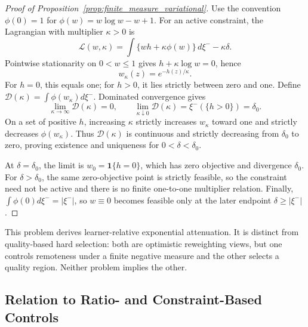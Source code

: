 \documentclass{article}
\theoremstyle{plain}
\theoremstyle{definition}
\theoremstyle{remark}
\begin{document}
\begin{proof}[Proof of Proposition~\ref{prop:finite_measure_variational}]
Use the convention
\(\phi(0)=1\) for
\(\phi(w)=w\log w-w+1\). For an active constraint, the Lagrangian with
multiplier \(\kappa>0\) is
\[
\mathcal L(w,\kappa)
=\int\{wh+\kappa\phi(w)\}\,d\xi^- -\kappa\delta.
\]
Pointwise stationarity on \(0<w\le1\) gives
\(h+\kappa\log w=0\), hence
\[
w_\kappa(z)=e^{-h(z)/\kappa}.
\]
For \(h=0\), this equals one; for \(h>0\), it lies strictly between
zero and one. Define
\(\mathcal D(\kappa)=\int\phi(w_\kappa)d\xi^-\). Dominated convergence gives
\[
\lim_{\kappa\to\infty}\mathcal D(\kappa)=0,
\qquad
\lim_{\kappa\downarrow0}\mathcal D(\kappa)
=\xi^-(\{h>0\})=\delta_0.
\]
On a set of positive \(h\), increasing \(\kappa\) strictly increases
\(w_\kappa\) toward one and strictly decreases \(\phi(w_\kappa)\).
Thus \(\mathcal D(\kappa)\) is continuous and strictly decreasing from
\(\delta_0\) to zero, proving existence and uniqueness for
\(0<\delta<\delta_0\).

At \(\delta=\delta_0\), the limit is
\(w_0=\mathbf1\{h=0\}\), which has zero objective and divergence
\(\delta_0\). For \(\delta>\delta_0\), the same zero-objective point is
strictly feasible, so the constraint need not be active and there is no
finite one-to-one multiplier relation. Finally,
\(\int\phi(0)d\xi^-=|\xi^-|\), so \(w\equiv0\) becomes feasible only at the later
endpoint \(\delta\ge|\xi^-|\).
\end{proof}

This problem derives learner-relative exponential attenuation. It is
distinct from quality-based hard selection: both are optimistic
reweighting views, but one controls remoteness under a finite negative
measure and the other selects a quality region. Neither problem implies
the other.

\subsection{Relation to Ratio- and Constraint-Based Controls}
\label{app:topr_relation}
\end{document}
